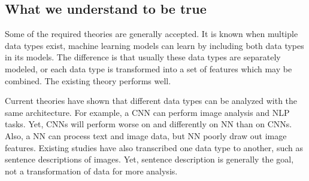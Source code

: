 \subsection{What we understand to be true}

Some of the required theories are generally accepted. It is known when multiple data types exist, machine learning models can learn by including both data types in its models.  The difference is that usually these data types are separately modeled, or each data type is transformed into a set of features which may be combined.  The existing theory performs well.  %

Current theories have shown that different data types can be analyzed with the same architecture.  For example, a CNN can perform image analysis and NLP tasks.  Yet, CNNs will perform worse on and differently on NN than on CNNs.  Also, a NN can process text and image data, but NN poorly draw out image features.  Existing studies have also transcribed one data type to another, such as sentence descriptions of images.  Yet, sentence description is generally the goal, not a transformation of data for more analysis. 
